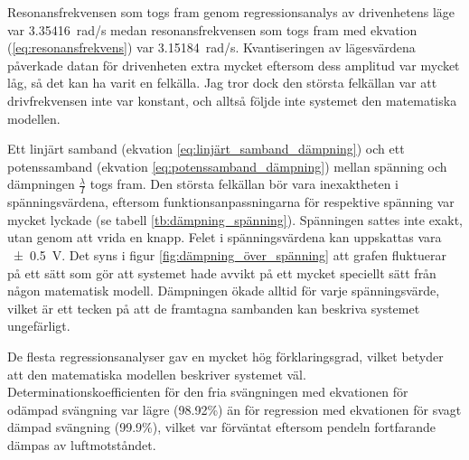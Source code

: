 \documentclass[12pt, a4paper]{article}
\begin{document}
Resonansfrekvensen som togs fram genom regressionsanalys av drivenhetens läge var \SI{3.35416}{rad/s} medan resonansfrekvensen som togs fram med ekvation (\ref{eq:resonansfrekvens}) var \SI{3.15184}{rad/s}. Kvantiseringen av lägesvärdena påverkade datan för drivenheten extra mycket eftersom dess amplitud var mycket låg, så det kan ha varit en felkälla. Jag tror dock den största felkällan var att drivfrekvensen inte var konstant, och alltså följde inte systemet den matematiska modellen.

Ett linjärt samband (ekvation \ref{eq:linjärt_samband_dämpning}) och ett potenssamband (ekvation \ref{eq:potenssamband_dämpning}) mellan spänning och dämpningen $\frac{\lambda}{I}$ togs fram. Den största felkällan bör vara inexaktheten i spännings\-värdena, eftersom funktionsanpassningarna för respektive spänning var mycket lyckade (se tabell \ref{tb:dämpning_spänning}). Spänningen sattes inte exakt, utan genom att vrida en knapp. Felet i spänningsvärdena kan uppskattas vara \SI{\pm0.5}{V}. Det syns i figur \ref{fig:dämpning_över_spänning} att grafen fluktuerar på ett sätt som gör att systemet hade avvikt på ett mycket speciellt sätt från någon matematisk modell. Dämpningen ökade alltid för varje spänningsvärde, vilket är ett tecken på att de framtagna sambanden kan beskriva systemet ungefärligt.

De flesta regressionsanalyser gav en mycket hög förklaringsgrad, vilket betyder att den matematiska modellen beskriver systemet väl. Determinationskoefficienten för den fria svängningen med ekvationen för odämpad svängning var lägre (98.92\%) än för regression med ekvationen för svagt dämpad svängning (99.9\%), vilket var förväntat eftersom pendeln fortfarande dämpas av luftmotståndet.
\end{document}
